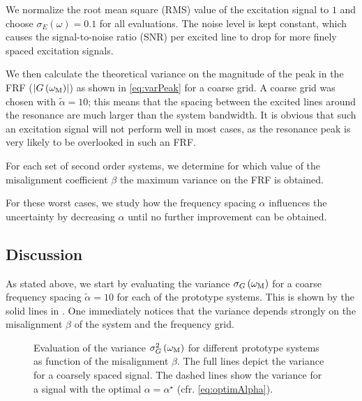   We normalize the root mean square (RMS) value of the excitation signal to $1$ and choose $\sigma_E\left( \omega \right) = 0.1$ for all evaluations.
  The noise level is kept constant, which causes the signal-to-noise ratio (SNR) per excited line to drop for more finely spaced excitation signals.
  
  We then calculate the theoretical variance on the magnitude of the peak in the FRF ($\left| G\left( \omega_{\mathrm{M}} \right) \right|$) as shown in \eqref{eq:varPeak} for a coarse grid.
  A coarse grid was chosen with $\tilde{\alpha} = 10$; this means that the spacing between the excited lines around the resonance are much larger than the system bandwidth.
  It is obvious that such an excitation signal will not perform well in most cases, as the resonance peak is very likely to be overlooked in such an FRF.
  
  For each set of second order systems, we determine for which value of the misalignment coefficient $\beta$ the maximum variance on the FRF is obtained.
  
  For these worst cases, we study how the frequency spacing $\alpha$ influences the uncertainty by decreasing $\alpha$ until no further improvement can be obtained.

  \subsection{Discussion} \label{sec:bestFrequencyResolution}
  As stated above, we start by evaluating the variance $\sigma_G\left( \omega_{\mathrm{M}}\right)$ for a coarse frequency spacing $\tilde{\alpha} = 10$ for each of the prototype systems.
  This is shown by the solid lines in .
  One immediately notices that the variance depends strongly on the misalignment $\beta$ of the system and the frequency grid.
  
  \begin{figure}
    \centering
      \setlength\figureheight{5cm}
      \setlength{}
    
    \caption[Variance $\sigma_G^2\left( \wM \right)$ as a function of the grid misalignment coefficient $\beta$.]{Evaluation of the variance $\sigma_G^2\left( \wM \right) $ for different prototype systems as function of the misalignment $\beta$.
             The full lines depict the variance for a coarsely spaced signal.
             The dashed lines show the variance for a signal with the optimal $\alpha = \alpha^{\star}$ (cfr. \eqref{eq:optimAlpha}).}
    \label{fig:worstCaseBeta}
  \end{figure}

